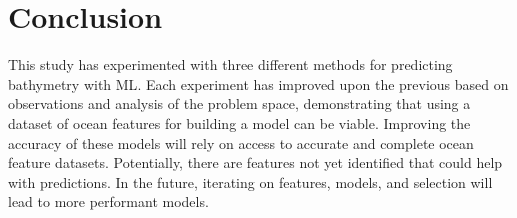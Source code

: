 \section{Conclusion}
\setlength{\parindent}{10ex}
This study has experimented with three different methods for predicting bathymetry with \ac{ML}.
Each experiment has improved upon the previous based on observations and analysis of the problem space, demonstrating that using a dataset of ocean features for building a model can be viable.
Improving the accuracy of these models will rely on access to accurate and complete ocean feature datasets.
Potentially, there are features not yet identified that could help with predictions.
In the future, iterating on features, models, and selection will lead to more performant models.